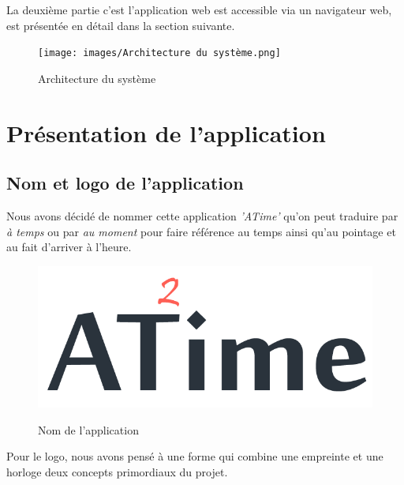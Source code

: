 La deuxième partie c’est l’application web est accessible via un navigateur
web, est présentée en détail dans la section suivante.

\vspace{10pt}
\begin{figure}[h!]
    \centering
    \texttt{[image: images/Architecture du système.png]}
    \label{fig84}
    \caption{Architecture du système}
    \label{figUFE}
\end{figure} 

\clearpage        
\section{Présentation de l'application}

\subsection{Nom et logo de l'application}
Nous avons décidé de nommer cette application \emph{'ATime'} qu’on peut traduire
par \emph{à temps} ou par \emph{au moment} pour faire référence au temps ainsi
qu’au pointage et au fait d'arriver à l'heure.

\begin{figure}[h!]
    \centering
    \includegraphics[scale=0.4 ]{images/graphique identity/app_name_dark.png}
    \label{fig85}
    \caption{Nom de l'application}
    \label{}
\end{figure} 

Pour le logo, nous avons pensé à une forme qui combine une empreinte et une 
horloge deux concepts primordiaux du projet.

